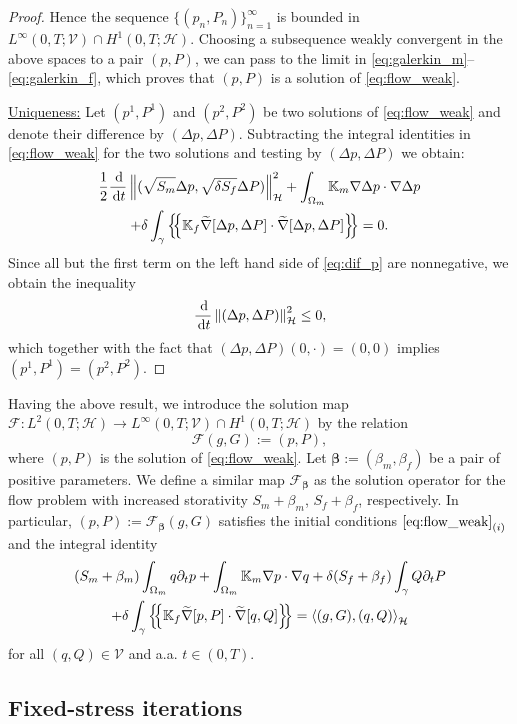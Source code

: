 \documentclass[a4paper]{article}
\def\agrad{\widetilde\nabla}
\def\avg#1{\left\{\mskip-5mu\left\{#1\right\}\mskip-5mu\right\}}
\def\d {\,{\rm d}}
\def\ddt#1{\frac{\d #1}{\d t}}
\def\dt{\prtl_t}
\def\dual#1#2{\left\langle #1,#2\right\rangle}
\def\Hf{\mathcal H}
\def\norm#1{\left\|#1\right\|}
\def\prtl{\partial}
\def\tn#1{{\mathbb{#1}}}    %
\def\Vf{{\mathcal V}} %
\def\vc#1{\mathbf{\boldsymbol{#1}}}     %
\newcommand{\eqs}[1]{\begin{equation*}#1\end{equation*}}
\newcommand{\ml}[1]{\begin{multline}#1\end{multline}}
\begin{document}
\begin{proof}
Hence the sequence $\{(p_n,P_n)\}_{n=1}^\infty$ is bounded in $L^\infty(0,T;\Vf)\cap H^1(0,T;\Hf)$.
Choosing a subsequence weakly convergent in the above spaces to a pair $(p,P)$, we can pass to the limit in \eqref{eq:galerkin_m}--\eqref{eq:galerkin_f}, which proves that $(p,P)$ is a solution of \eqref{eq:flow_weak}.

\underline{Uniqueness:}
Let $(p^1,P^1)$ and $(p^2,P^2)$ be two solutions of \eqref{eq:flow_weak} and denote their difference by $(\Delta p,\Delta P)$.
Subtracting the integral identities in \eqref{eq:flow_weak} for the two solutions and testing by $(\Delta p,\Delta P)$ we obtain:
\ml{ \label{eq:dif_p} \frac12\ddt{}\norm{(\sqrt{S_m}\Delta p,\sqrt{\delta S_f}\Delta P)}_\Hf^2
+ \int_{\Omega_m}\tn K_m\nabla\Delta p\cdot\nabla\Delta p\\
+ \delta\int_\gamma\avg{\tn K_f\agrad[\Delta p,\Delta P]\cdot\agrad[\Delta p,\Delta P]} = 0. }
Since all but the first term on the left hand side of \eqref{eq:dif_p} are nonnegative, we obtain the inequality
\eqs{ \ddt{}\norm{(\Delta p,\Delta P)}_\Hf^2 \le 0, }
which together with the fact that $(\Delta p,\Delta P)(0,\cdot) = (0,0)$ implies $(p^1,P^1)=(p^2,P^2)$.
\end{proof}
% 
Having the above result, we introduce the solution map $\mathcal F:L^2(0,T;\Hf)\to L^\infty(0,T;\Vf)\cap H^1(0,T;\Hf)$ by the relation
\eqs{ \mathcal F(g,G) := (p,P), }
where $(p,P)$ is the solution of \eqref{eq:flow_weak}.
Let $\vc\beta:=(\beta_m,\beta_f)$ be a pair of positive parameters.
We define a similar map $\mathcal F_{\vc\beta}$ as the solution operator for the flow problem with increased storativity $S_m+\beta_m$, $S_f+\beta_f$, respectively.
In particular, $(p,P):=\mathcal F_{\vc\beta}(g,G)$ satisfies the initial conditions $\eqref{eq:flow_weak}_{(i)}$ and the integral identity
\ml{ \label{eq:flow_problem_beta} (S_m+\beta_m)\int_{\Omega_m} q\dt p + \int_{\Omega_m}\tn K_m\nabla p\cdot\nabla q + \delta (S_f+\beta_f)\int_\gamma Q\dt P\\
+ \delta\int_\gamma\avg{\tn K_f\agrad[p,P]\cdot\agrad[q,Q]}
= \dual{(g,G)}{(q,Q)}_\Hf }
for all $(q,Q)\in\Vf$ and a.a. $t\in(0,T)$.



\subsection{Fixed-stress iterations}\label{sec:iter}
\end{document}
